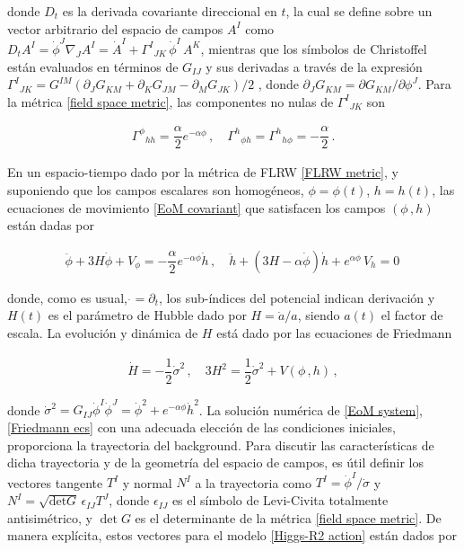\documentclass[12pt,a4paper,english,nofootinbib]{revtex4}
\newcommand{\beq}{\begin{eqnarray}}
\newcommand{\enq}{\end{eqnarray}}
\begin{document}
donde $D_t$ es la derivada covariante direccional en $t$, la cual se define sobre un vector arbitrario del espacio de campos $A^I$ como $D_t A^I = \dot{\phi}^J \nabla_J A^I = \dot{A}^I + \Gamma^I{}_{JK}\,\dot{\phi}^I\,A^K$, mientras que los símbolos de Christoffel están evaluados en términos de $G_{IJ}$ y sus derivadas a través de la expresión $\Gamma^I{}_{JK} = G^{IM}(\partial_J G_{KM} + \partial_K G_{JM} -\partial_M G_{JK} )/2$
, donde $\partial_J G_{KM} = \partial G_{KM}/\partial \phi^J$. Para la métrica \eqref{field space metric}, las componentes no nulas de $\Gamma^I{}_{JK}$ son 

\beq 
\Gamma^\phi{}_{h h} = \dfrac{\alpha}{2}e^{-\alpha\phi}\,,\quad \Gamma^h{}_{\phi h} = \Gamma^h{}_{h \phi} = -\dfrac{\alpha}{2}\,.
\label{Christoffel}
\enq 


En un espacio-tiempo dado por la métrica de FLRW \eqref{FLRW metric}, y suponiendo que los campos escalares son homogéneos, $\phi = \phi(t)$, $h = h(t)$, las ecuaciones de movimiento \eqref{EoM covariant} que satisfacen los campos $(\phi\,,h)$ están dadas por


\begin{align}
 \ddot{\phi} + 3H\dot{\phi} + V_\phi = -\dfrac{\alpha}{2}e^{-\alpha\phi}\dot{h}\,,\quad 
    \ddot{h} + (3H -\alpha\dot{\phi})\dot{h} + e^{\alpha\phi}\,V_h = 0\,
    \label{EoM system}
\end{align}

donde, como es usual, $\dot{} = \partial_t$, los sub-índices del potencial indican derivación y $H(t)$ es el parámetro de Hubble dado por $H= \dot{a}/a$, siendo $a(t)$ el factor de escala. La evolución y dinámica de $H$ está dado por las ecuaciones de Friedmann 

\begin{align}
\dot{H} = - \dfrac{1}{2} \dot{\sigma}^2 \,,\quad 
 3 H^2 = \dfrac{1}{2}\dot{\sigma}^2 + V(\phi\,,h)\,,
 \label{Friedmann ecs}
\end{align}


donde $\dot{\sigma}^2 = G_{IJ}\dot{\phi}^I\dot{\phi}^J =  \dot{\phi}^2 + e^{-\alpha\phi}\dot{h}^2$. La solución numérica de \eqref{EoM system}, \eqref{Friedmann ecs} con una adecuada elección de las condiciones iniciales, proporciona la trayectoria del background.  Para discutir las características de dicha trayectoria y de la geometría del espacio de campos, es útil definir los vectores tangente $T^I$ y normal $N^I$ a la trayectoria como $T^I = \dot{\phi}^I/\dot{\sigma}$ y $N^I =\sqrt{\text{det} G}\,\epsilon_{IJ} T^J$, donde $\epsilon_{IJ}$ es el símbolo de Levi-Civita totalmente antisimétrico, y $\det G$ es el determinante de la métrica \eqref{field space metric}.  De manera explícita, estos vectores para el modelo \eqref{Higgs-R2 action} están dados por 
\end{document}
